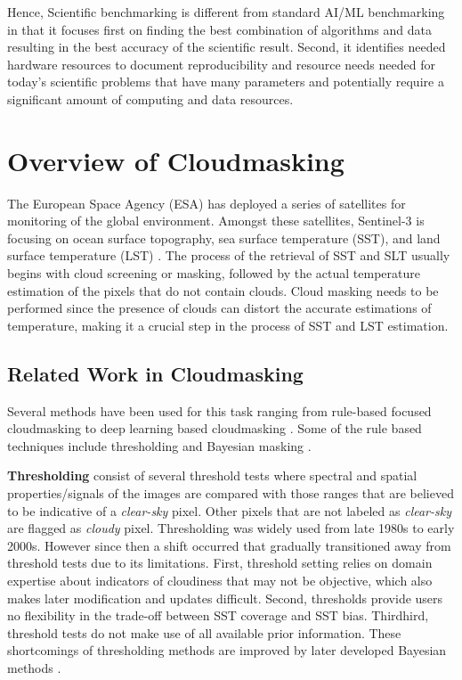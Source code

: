 \documentclass[sigplan,screen]{acmart}
\begin{document}
Hence, Scientific benchmarking is different from standard AI/ML benchmarking in that it focuses first on finding the best combination of algorithms and data resulting in the best accuracy of the scientific result. Second, it identifies needed hardware resources to document reproducibility and resource needs needed for today's scientific problems that have many parameters and potentially require a significant amount of computing and data resources. 


\section{Overview of Cloudmasking}

The European Space Agency (ESA) has deployed a series of satellites for monitoring of the global environment. Amongst these satellites, Sentinel-3 is focusing on ocean surface topography, sea surface temperature (SST), and land surface temperature (LST) \cite{www-sentinal-3}. The process of the retrieval of SST and SLT usually begins with cloud screening or masking, followed by the actual temperature estimation of the pixels that do not contain clouds. Cloud masking needs to be performed since the presence of clouds can distort the accurate estimations of temperature, making it a crucial step in the process of SST and LST estimation.

\subsection{Related Work in Cloudmasking}
\label{sec:related}

Several methods have been used for this task ranging from rule-based focused cloudmasking to deep learning based cloudmasking \cite{WIELAND2019111203,Yan2018CloudAC}.  Some of the rule based techniques include thresholding \cite{Saunders1986AnAS,Saunders1988AnIM} and Bayesian masking \cite{Merchant2005ProbabilisticPB}. 

{\bf Thresholding} consist of several threshold tests where spectral and spatial properties/signals of the images are compared with those ranges that are believed to be indicative of a {\em clear-sky} pixel. Other pixels that are not labeled as {\em clear-sky} are flagged as {\em cloudy} pixel. Thresholding was widely used from late 1980s to early 2000s. However since then a shift occurred that gradually transitioned away from threshold tests due to its limitations. First, threshold setting relies on domain expertise about indicators of cloudiness that may not be objective, which also makes later modification and updates difficult. Second, thresholds provide users no flexibility in the trade-off between SST coverage and SST bias. Thirdhird, threshold tests do not make use of all available prior information. These shortcomings of thresholding methods are improved by later developed Bayesian methods  \cite{unkown}.
\end{document}
